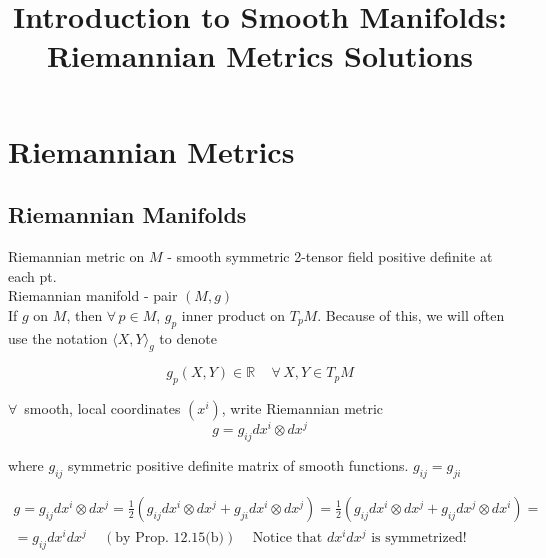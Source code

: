\documentclass[11pt]{amsart}
\title{Introduction to Smooth Manifolds: Riemannian Metrics Solutions}
\theoremstyle{definition}
\begin{document}
\maketitle
\section{ Riemannian Metrics}
%
%

\subsection*{Riemannian Manifolds}

Riemannian metric on $M$ - smooth symmetric 2-tensor field positive definite at each pt.   \\

Riemannian manifold - pair $(M,g)$ \\

If $g$ on $M$, then $\forall \, p \in M$, $g_p$ inner product on $T_pM$.  Because of this, we will often use the notation $\langle X, Y\rangle_g$ to denote

\[
g_p(X,Y) \in \mathbb{R} \quad \, \forall \, X, Y \in T_pM
\]

$\forall \, $ smooth, local coordinates $(x^i)$, write Riemannian metric
\[
g=g_{ij} dx^i \otimes dx^j
\]

where $g_{ij}$ symmetric positive definite matrix of smooth functions.  $g_{ij} = g_{ji}$

\[
\begin{gathered}
  g = g_{ij} dx^i \otimes dx^j = \frac{1}{2} (g_{ij} dx^i \otimes dx^j + g_{ji} dx^i \otimes dx^j ) = \frac{1}{2} (g_{ij} dx^i \otimes dx^j + g_{ij} dx^j \otimes dx^i ) = \\
  = g_{ij} dx^i dx^j \quad \, (\text{by Prop. 12.15(b)}) \quad \, \text{Notice that $dx^idx^j$ is symmetrized!}
\end{gathered}
\]
\end{document}
